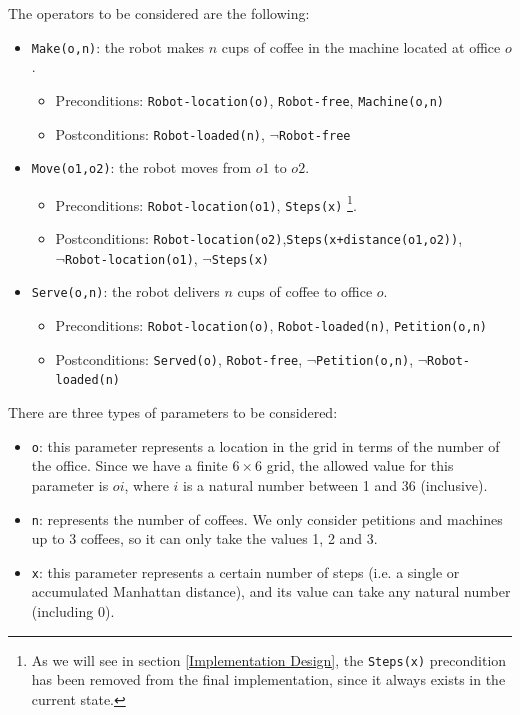 \documentclass[12pt,a4paper,oneside]{article}
\numberwithin{equation}{section}
\numberwithin{equation}{section}
\theoremstyle{definition}
\begin{document}
The operators to be considered are the following:
\begin{itemize}
	\item \texttt{Make(o,n)}: the robot makes $n$ cups of coffee in the machine located at office $o$.
	\begin{itemize}
		\item Preconditions: \texttt{Robot-location(o)}, \texttt{Robot-free}, \texttt{Machine(o,n)}
		\item Postconditions: \texttt{Robot-loaded(n)}, $\neg$\texttt{Robot-free}
	\end{itemize}
	\item \texttt{Move(o1,o2)}: the robot moves from $o1$ to $o2$.
	\begin{itemize}
		\item Preconditions: \texttt{Robot-location(o1)}, \texttt{Steps(x)} \footnote{As we will see in section \ref{Implementation Design}, the \texttt{Steps(x)} precondition has been removed from the final implementation, since it always exists in the current state.}.
		\item Postconditions: \texttt{Robot-location(o2)},\texttt{Steps(x+distance(o1,o2))}, \\
		$\neg$\texttt{Robot-location(o1)}, $\neg$\texttt{Steps(x)}
	\end{itemize}
	\item \texttt{Serve(o,n)}: the robot delivers $n$ cups of coffee to office $o$.
	\begin{itemize}
		\item Preconditions: \texttt{Robot-location(o)}, \texttt{Robot-loaded(n)}, \texttt{Petition(o,n)}
		\item Postconditions: \texttt{Served(o)}, \texttt{Robot-free}, $\neg$\texttt{Petition(o,n)}, $\neg$\texttt{Robot-loaded(n)}
	\end{itemize}
\end{itemize}

There are three types of parameters to be considered:
\begin{itemize}
	\item \texttt{o}: this parameter represents a location in the grid in terms of the number of the office. Since we have a finite $6 \times 6$ grid, the allowed value for this parameter is $oi$, where $i$ is a natural number between 1 and 36 (inclusive).
	\item \texttt{n}: represents the number of coffees. We only consider petitions and machines up to 3 coffees, so it can only take the values 1, 2 and 3.
	\item \texttt{x}: this parameter represents a certain number of steps (i.e. a single or accumulated Manhattan distance), and its value can take any natural number (including 0). 
\end{itemize}
\end{document}
